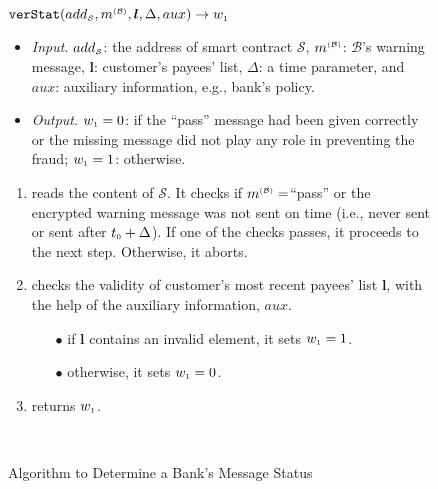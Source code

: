 \begin{figure}[!htbp]
\setlength{\fboxsep}{0.7pt}
\begin{center}
\begin{boxedminipage}{12cm}
\small{
\underline{$\mathtt{verStat}(add_{\scriptscriptstyle\mathcal{S}}, m^{\scriptscriptstyle\mathcal{(B)}},  \bm l, \Delta, aux)\rightarrow w_{\scriptscriptstyle 1}$}\\
%
\begin{itemize}
\item\noindent\textit{Input}. $add_{\scriptscriptstyle\mathcal{S}}$: the address of smart contract $\mathcal{S}$, $m^{\scriptscriptstyle\mathcal{(B)}}$:  $\mathcal{B}$'s warning message,  $\bm l$:  customer's payees' list, $\Delta$: a time parameter, and $aux$: auxiliary information, e.g., bank's policy. 
%
\item\noindent\textit{Output}. $ w_{\scriptscriptstyle 1}=0$: if the ``pass'' message had been given correctly or the missing message did not play any role in preventing the fraud; $ w_{\scriptscriptstyle 1}=1$: otherwise. 
\end{itemize}
\begin{enumerate}
\item reads the content of   $\mathcal{S}$. It checks if $m^{\scriptscriptstyle\mathcal{(B)}}=$``pass''  or the encrypted warning message was not sent on time (i.e., never sent or sent after    $t_{\scriptscriptstyle 0}+\Delta$).  If one of the checks passes, it proceeds to the next step. Otherwise, it aborts. 
\item checks the validity of  customer's most recent payees' list $\bm l$, with the help of the auxiliary information, $aux$. 
\begin{itemize}
\item[$\bullet$]  if $\bm l$ contains an invalid element,  it sets $ w_{\scriptscriptstyle 1}=1$.
\item [$\bullet$] otherwise, it sets $ w_{\scriptscriptstyle 1}=0$.
\end{itemize}
\item returns $ w_{\scriptscriptstyle 1}$.

\

\end{enumerate}

}
\end{boxedminipage}
\end{center}
\caption{Algorithm to Determine a Bank's Message Status} 
\label{fig:verStat}
\end{figure}
